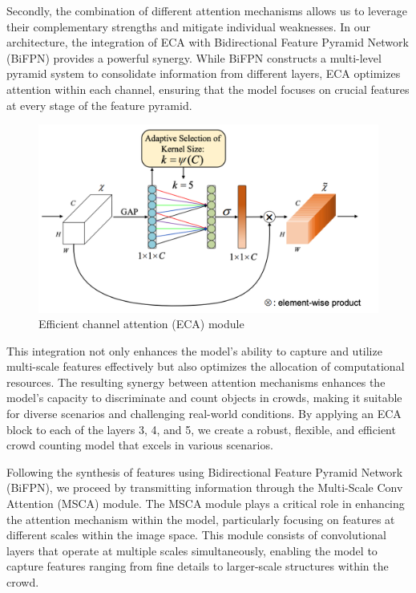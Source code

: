 \documentclass[journal]{IEEEtran}
\begin{document}
Secondly, the combination of different attention mechanisms allows us to leverage their complementary strengths and mitigate individual weaknesses. In our architecture, the integration of ECA with Bidirectional Feature Pyramid Network (BiFPN) provides a powerful synergy. While BiFPN constructs a multi-level pyramid system to consolidate information from different layers, ECA optimizes attention within each channel, ensuring that the model focuses on crucial features at every stage of the feature pyramid.

\begin{figure}[ht]
        \centering
        \includegraphics[width=\linewidth]{Fig/ECA.png}
        \caption{Efficient channel attention (ECA) module}
        \label{ecamodule}
\end{figure}

This integration not only enhances the model's ability to capture and utilize multi-scale features effectively but also optimizes the allocation of computational resources. The resulting synergy between attention mechanisms enhances the model's capacity to discriminate and count objects in crowds, making it suitable for diverse scenarios and challenging real-world conditions. By applying an ECA block to each of the layers 3, 4, and 5, we create a robust, flexible, and efficient crowd counting model that excels in various scenarios.

Following the synthesis of features using Bidirectional Feature Pyramid Network (BiFPN), we proceed by transmitting information through the Multi-Scale Conv Attention (MSCA) module. The MSCA module plays a critical role in enhancing the attention mechanism within the model, particularly focusing on features at different scales within the image space. This module consists of convolutional layers that operate at multiple scales simultaneously, enabling the model to capture features ranging from fine details to larger-scale structures within the crowd.
\end{document}

